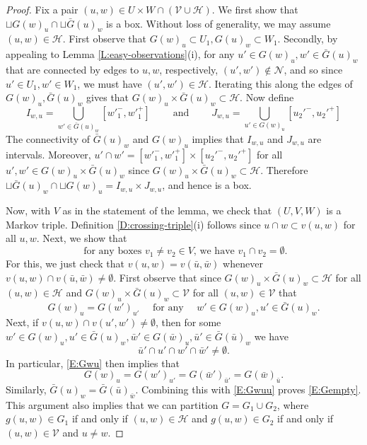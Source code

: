 \documentclass[aop, preprint]{imsart}
\theoremstyle{plain}
\theoremstyle{definition}
\theoremstyle{plain}
\newcommand{\sset}{\subset}
\newcommand{\mathand}{\;\text{and}\;}
\newcommand{\scrV}{\mathcal{V}}
\newcommand{\scrH}{\mathcal{H}}
\newcommand{\scrN}{\mathcal{N}}
\newcommand{\X}{\times}
\begin{document}
\begin{proof}
	Fix a pair $(u, w) \in U \X W \cap (\scrV \cup \scrH)$. We first show that $\sqcup G(w)_u \cap \sqcup \bar G(u)_w$ is a box. Without loss of generality, we may assume $(u, w) \in \scrH$.
	First observe that $G(w)_u \sset U_1, G(u)_w \sset W_1$. Secondly, by appealing to Lemma \ref{L:easy-observations}(i), for any $u' \in G(w)_u, w' \in \bar G(u)_w $ that are connected by edges to $u, w$, respectively, $(u', w') \notin \scrN$, and so since $u' \in U_1, w' \in W_1$, we must have $(u', w') \in \scrH$. Iterating this along the edges of $G(w)_u, \bar G(u)_w$ gives that $G(w)_u \X \bar G(u)_w \sset \scrH$.
	Now define
	$$
	I_{w, u} = \bigcup_{w' \in \bar G(u)_w} [w'^-_1, w'^+_1] \qquad \mathand \qquad J_{w, u} = \bigcup_{u' \in G(w)_u} [u_2'^-, u_2'^+]
	$$
	The connectivity of $\bar G(u)_w$ and $G(w)_u$ implies that $I_{w, u}$ and $J_{w, u}$ are intervals. Moreover, $u' \cap w' = [w'^-_1, w'^+_1] \X [u_2'^-, u_2'^+]$ for all $u', w' \in G(w)_u \X \bar G(u)_w$ since $G(w)_u \X \bar G(u)_w \sset \scrH$. Therefore $\sqcup \bar G(u)_w \cap \sqcup  G(w)_u = I_{w, u} \X J_{w, u}$, and hence is a box.
	
	Now, with $V$ as in the statement of the lemma, we check that $(U, V, W)$ is a Markov triple. Definition \ref{D:crossing-triple}(i) follows since $u \cap w \sset v(u, w)$ for all $u, w$. Next, we show that 
	\begin{equation}
	\label{E:Gempty}
	\text{ for any boxes $v_1 \ne v_2 \in V$, we have $v_1 \cap v_2 = \emptyset$.}
	\end{equation}
	For this, we just check that $v(u, w) = v(\bar u, \bar w)$ whenever $v(u, w) \cap v(\bar u, \bar w) \ne \emptyset$. First observe that since $G(w)_u \X \bar G(u)_w \sset \scrH$ for all $(u, w) \in \scrH$ and $G(w)_u \X \bar G(u)_w \sset \scrV$ for all $(u, w) \in \scrV$ that 
	\begin{equation}
	\label{E:Gwu}
	G(w)_u = G(w')_{u'} \quad \text{ for any } \quad w' \in G(w)_u, u' \in \bar G(u)_w. 
	\end{equation}
	Next, if $v(u, w) \cap v(u', w') \ne \emptyset$, then for some $w' \in G(w)_u, u' \in \bar G(u)_w, \bar w' \in G(\bar w)_u, \bar u' \in \bar G(\bar u)_w$ we have
	$$
	\bar u' \cap u' \cap w' \cap \bar w' \ne \emptyset.
	$$
	In particular, \eqref{E:Gwu} then implies that
	\begin{equation}
	\label{E:Gwuu}
	G(w)_u = G(w')_{u'} = G(\bar w')_{\bar u'} = G(\bar w)_{\bar u}.
	\end{equation}
	Similarly, $\bar G(u)_w = \bar G(\bar u)_{\bar w}$. Combining this with \eqref{E:Gwuu} proves \eqref{E:Gempty}.
	This argument also implies that we can partition $G = G_1 \cup G_2$, where $g(u, w) \in G_1$ if and only if $(u, w) \in \scrH$ and $g(u, w) \in G_2$ if and only if $(u, w) \in \scrV$ and $u \ne w$. 
	

\end{proof}
\end{document}
